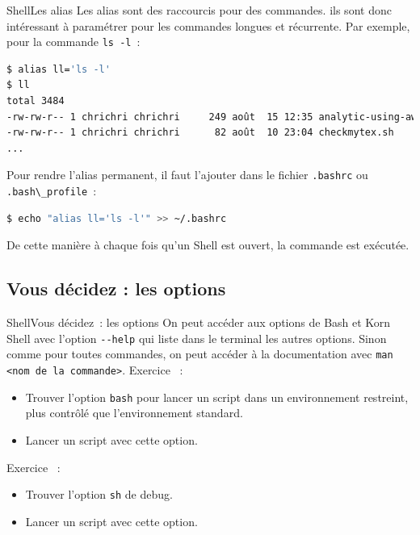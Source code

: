 \documentclass{beamer}
\begin{document}
    \begin{frame}[fragile]{Shell}{Les alias}
        Les alias sont des raccourcis pour des commandes.
        ils sont donc intéressant à paramétrer pour les commandes longues et récurrente.
        \bigbreak
        Par exemple, pour la commande \lstinline{ls -l}~:
        \begin{lstlisting}[language=bash]
$ alias ll='ls -l'
$ ll
total 3484
-rw-rw-r-- 1 chrichri chrichri     249 août  15 12:35 analytic-using-awk.sh
-rw-rw-r-- 1 chrichri chrichri      82 août  10 23:04 checkmytex.sh
...
        \end{lstlisting}
        \bigbreak
        Pour rendre l'alias permanent, il faut l'ajouter dans le fichier \lstinline{.bashrc} ou \lstinline{.bash\_profile}~:
        \begin{lstlisting}[language=bash]
$ echo "alias ll='ls -l'" >> ~/.bashrc
        \end{lstlisting}
        De cette manière à chaque fois qu'un Shell est ouvert, la commande est exécutée.
    \end{frame}

    \subsection{Vous décidez : les options}\label{subsec:shell-options}

    \begin{frame}[fragile]{Shell}{Vous décidez~: les options}
        On peut accéder aux options de Bash et Korn Shell avec l'option \lstinline{--help} qui liste dans le terminal les autres options.
        \bigbreak
        Sinon comme pour toutes commandes, on peut accéder à la documentation avec \lstinline{man <nom de la commande>}.
        \bigbreak
        Exercice \execcounterdispinc~:
        \begin{itemize}
            \item Trouver l'option \lstinline{bash} pour lancer un script dans un environnement restreint, plus contrôlé que l'environnement standard.
            \item Lancer un script avec cette option.
        \end{itemize}
        Exercice \execcounterdispinc~:
        \begin{itemize}
            \item Trouver l'option \lstinline{sh} de debug.
            \item Lancer un script avec cette option.
        \end{itemize}
    \end{frame}
\end{document}
